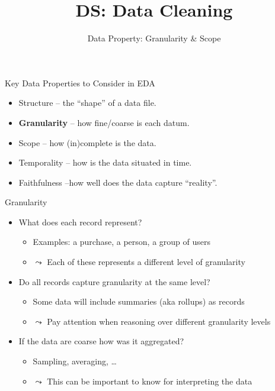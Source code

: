 \documentclass[aspectratio=169]{../latex_main/tntbeamer}  %
\title[Data Property: Granularity \& Scope]{DS: Data Cleaning}
\subtitle{Data Property: Granularity \& Scope}
\begin{document}
	
	\maketitle

\begin{frame}[c]{Key Data Properties to Consider in EDA}
    \begin{itemize}
        \item {Structure} -- the “shape” of a data file.
        \item \textbf{Granularity} -- how fine/coarse is each datum.
        \item {Scope} -- how (in)complete is the data.
        \item {Temporality} -- how is the data situated in time.
        \item {Faithfulness} --how well does the data capture “reality”.
    \end{itemize}
\end{frame}

\begin{frame}[c]{Granularity}

    \begin{itemize}
        \item What does each record represent?
        \begin{itemize}
            \item Examples: a purchase, a person, a group of users
            \item $\leadsto$ Each of these represents a different level of granularity
        \end{itemize}
        \pause
        \item Do all records capture granularity at the same level?
        \begin{itemize}
            \item Some data will include summaries (aka rollups) as records
            \item $\leadsto$ Pay attention when reasoning over different granularity levels
        \end{itemize}
        \pause
        \item If the data are coarse how was it aggregated?
        \begin{itemize}
            \item Sampling, averaging, …
            \item $\leadsto$ This can be important to know for interpreting the data
        \end{itemize}
    \end{itemize}
\end{frame}
\end{document}
